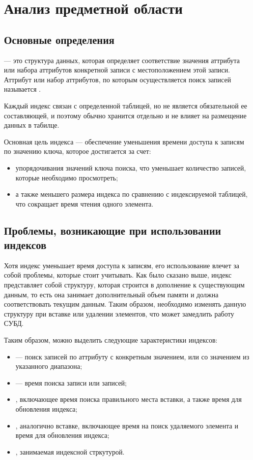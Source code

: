 \chapter{Анализ предметной области}

\section{Основные определения}

 --- это структура данных, которая определяет соответствие значения
аттрибута или набора аттрибутов конкретной записи с местоположением этой записи.
Аттрибут или набор аттрибутов, по которым осуществляется поиск записей
называется .

Каждый индекс связан с определенной таблицей, но не является обязательной ее
составляющей, и поэтому обычно хранится отдельно и не влияет на размещение
данных в табилце.

Основная цель индекса --- обеспечение уменьшения времени доступа к записям по
значению ключа, которое достигается за счет:

\begin{itemize}
    \item упорядочивания значений ключа поиска, что уменьшает количество
        записей, которые необходимо просмотреть;
    \item а также меньшего размера индекса по сравнению с индексируемой
        таблицей, что сокращает время чтения одного элемента.
\end{itemize}

\section{Проблемы, возникающие при использовании индексов}

Хотя индекс уменьшает время доступа к записям, его использование влечет за собой
проблемы, которые стоит учитывать. Как было сказано выше, индекс представляет
собой структуру, которая строится в дополнение к существующим данным, то есть
она занимает дополнительный объем памяти и должна соответствовать текущим
данным. Таким образом, необходимо изменять данную структуру при вставке или
удалении элементов, что может замедлить работу СУБД.

Таким образом, можно выделить следующие характеристики индексов:

\begin{itemize}
    \item {} --- поиск записей по аттрибуту с конкретным
        значением, или со значением из указанного диапазона;
    \item {} --- время поиска записи или записей;
    \item {}, включающее время поиска правильного места вставки, а
        также время для обновления индекса;
    \item {}, аналогично вставке, включающее время на поиск
        удаляемого элемента и время для обновления индекса;
    \item {}, занимаемая индексной стркутурой.
\end{itemize}


